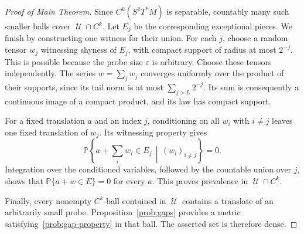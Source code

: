 \documentclass[10pt,oneside,reqno]{amsproc}
\numberwithin{equation}{section}
\theoremstyle{definition}
\theoremstyle{remark}
\newcommand{\eps}{\varepsilon}
\DeclareMathOperator{\cU}{{\mathscr U}}
\begin{document}
\begin{proof}[Proof of Main Theorem]
Since $C^k(S^2T^*M)$ is separable, countably many such smaller balls cover $\cU\cap C^k$. Let $E_j$ be the corresponding exceptional pieces. We finish by constructing one witness for their union. For each $j$, choose a random tensor $w_j$ witnessing shyness of $E_j$, with compact support of radius at most $2^{-j}$. This is possible because the probe size $\eps$ is arbitrary. Choose these tensors independently. The series $w=\sum_jw_j$ converges uniformly over the product of their supports, since its tail norm is at most $\sum_{j>L}2^{-j}$. Its sum is consequently a continuous image of a compact product, and its law has compact support.

For a fixed translation $a$ and an index $j$, conditioning on all $w_i$ with $i\ne j$ leaves one fixed translation of $w_j$. Its witnessing property gives
\[
 \mathbb P\left\{a+\sum_iw_i\in E_j\,\middle|\,(w_i)_{i\ne j}\right\}=0.
\]
Integration over the conditioned variables, followed by the countable union over $j$, shows that $\mathbb P\{a+w\in E\}=0$ for every $a$. This proves prevalence in $\cU\cap C^k$.

Finally, every nonempty $C^k$-ball contained in $\cU$ contains a translate of an arbitrarily small probe. Proposition~\ref{prob:gaps} provides a metric satisfying~\eqref{prob:gap-property} in that ball. The asserted set is therefore dense.
\end{proof}
\end{document}
